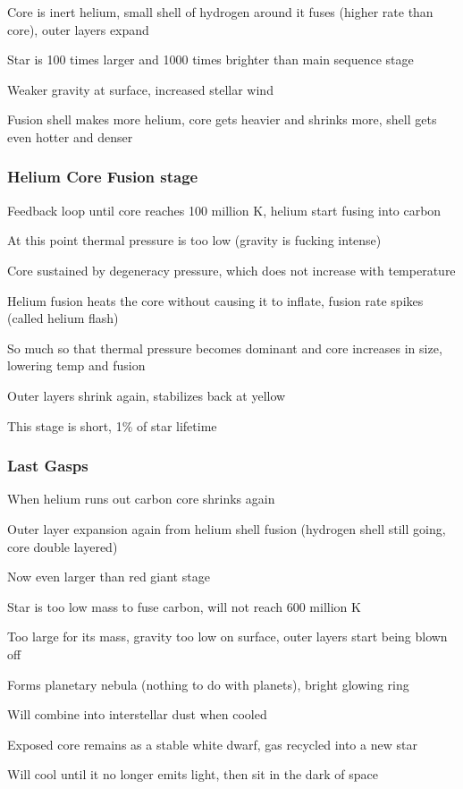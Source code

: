 Core is inert helium, small shell of hydrogen around it fuses (higher rate than core), outer layers expand

Star is 100 times larger and 1000 times brighter than main sequence stage

Weaker gravity at surface, increased stellar wind

Fusion shell makes more helium, core gets heavier and shrinks more, shell gets even hotter and denser

\subsubsection{Helium Core Fusion stage}
Feedback loop until core reaches 100 million K, helium start fusing into carbon

At this point thermal pressure is too low (gravity is fucking intense)

Core sustained by degeneracy pressure, which does not increase with temperature

Helium fusion heats the core without causing it to inflate, fusion rate spikes (called helium flash)

So much so that thermal pressure becomes dominant and core increases in size, lowering temp and fusion

Outer layers shrink again, stabilizes back at yellow

This stage is short, 1\% of star lifetime

\subsubsection{Last Gasps}
When helium runs out carbon core shrinks again

Outer layer expansion again from helium shell fusion (hydrogen shell still going, core double layered)

Now even larger than red giant stage

Star is too low mass to fuse carbon, will not reach 600 million K

Too large for its mass, gravity too low on surface, outer layers start being blown off

Forms planetary nebula (nothing to do with planets), bright glowing ring

Will combine into interstellar dust when cooled

Exposed core remains as a stable white dwarf, gas recycled into a new star

Will cool until it no longer emits light, then sit in the dark of space

